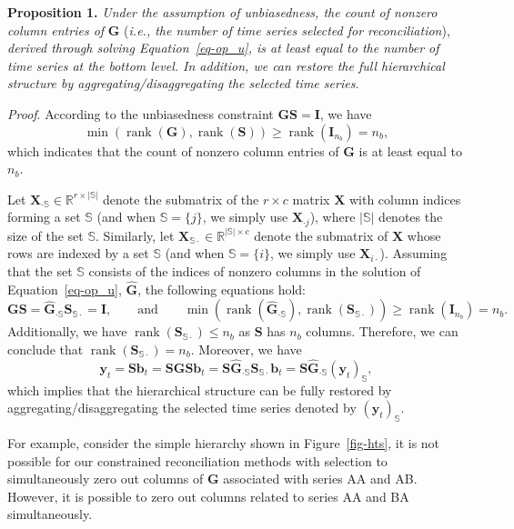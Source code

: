 \documentclass[
  12pt,
  11pt]{article}
\begin{document}
\textbf{Proposition 1.} \emph{Under the assumption of unbiasedness, the
count of nonzero column entries of} \(\bm{G}\) (\emph{i.e., the number
of time series selected for reconciliation}), \emph{derived through
solving Equation~\ref{eq-op_u}, is at least equal to the number of time
series at the bottom level. In addition, we can restore the full
hierarchical structure by aggregating/disaggregating the selected time
series.}

\emph{Proof}. According to the unbiasedness constraint
\(\bm{GS}=\bm{I}\), we have \[
\min \left(\operatorname{rank}(\bm{G}), \operatorname{rank}(\bm{S})\right) \geq \operatorname{rank}(\bm{I}_{n_b})=n_b,
\] which indicates that the count of nonzero column entries of
\(\bm{G}\) is at least equal to \(n_b\).

Let \(\bm{X}_{\cdot \mathbb{S}} \in \mathbb{R}^{r \times |\mathbb{S}|}\)
denote the submatrix of the \(r \times c\) matrix \(\bm{X}\) with column
indices forming a set \(\mathbb{S}\) (and when \(\mathbb{S} = \{j\}\),
we simply use \(\bm{X}_{\cdot j}\)), where \(|\mathbb{S}|\) denotes the
size of the set \(\mathbb{S}\). Similarly, let
\(\bm{X}_{\mathbb{S}\cdot} \in \mathbb{R}^{|\mathbb{S}| \times c}\)
denote the submatrix of \(\bm{X}\) whose rows are indexed by a set
\(\mathbb{S}\) (and when \(\mathbb{S} = \{i\}\), we simply use
\(\bm{X}_{i\cdot}\)). Assuming that the set \(\mathbb{S}\) consists of
the indices of nonzero columns in the solution of
Equation~\ref{eq-op_u}, \(\hat{\bm{G}}\), the following equations hold:
\[
\bm{G}\bm{S} = \hat{\bm{G}}_{\cdot \mathbb{S}}\bm{S}_{\mathbb{S}\cdot} = \bm{I},
\qquad\text{and}\qquad
\min \left(\operatorname{rank}(\hat{\bm{G}}_{\cdot \mathbb{S}}), \operatorname{rank}(\bm{S}_{\mathbb{S}\cdot})\right) \geq \operatorname{rank}(\bm{I}_{n_b})=n_b.
\] Additionally, we have
\(\operatorname{rank}(\bm{S}_{\mathbb{S}\cdot}) \leq n_b\) as \(\bm{S}\)
has \(n_b\) columns. Therefore, we can conclude that
\(\operatorname{rank}(\bm{S}_{\mathbb{S}\cdot}) = n_b\). Moreover, we
have \[
\bm{y}_t = \bm{S}\bm{b}_t = \bm{S}\bm{G}\bm{S}\bm{b}_t=\bm{S}\hat{\bm{G}}_{\cdot\mathbb{S}}\bm{S}_{\mathbb{S}\cdot}\bm{b}_t=\bm{S}\hat{\bm{G}}_{\cdot \mathbb{S}}(\bm{y}_t)_{\mathbb{S}},
\] which implies that the hierarchical structure can be fully restored
by aggregating/disaggregating the selected time series denoted by
\((\bm{y}_{t})_{\mathbb{S}}\).

For example, consider the simple hierarchy shown in
Figure~\ref{fig-hts}, it is not possible for our constrained
reconciliation methods with selection to simultaneously zero out columns
of \(\bm{G}\) associated with series AA and AB. However, it is possible
to zero out columns related to series AA and BA simultaneously.
\end{document}
